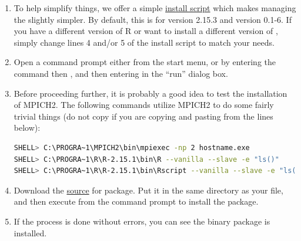 \begin{enumerate}
  \item To help simplify things, we offer a simple \href{https://github.com/wrathematics/installation-instructions/raw/master/windows/build_pbdMPI.bat}{install script} which makes managing the  slightly simpler.  By default, this is for  version 2.15.3 and  version 0.1-6.  If you have a different version of R or want to install a different version of , simply change lines 4 and/or 5 of the install script to match your needs.
  \item Open a command prompt either from the start menu, or by entering the command  then , and then entering  in the ``run'' dialog box.
  \item Before proceeding further, it is probably a good idea to test the installation of MPICH2.  The following commands utilize MPICH2 to do some fairly trivial things (do not copy  if you are copying and pasting from the lines below):
\begin{lstlisting}[language=sh]
SHELL> C:\PROGRA~1\MPICH2\bin\mpiexec -np 2 hostname.exe
SHELL> C:\PROGRA~1\R\R-2.15.1\bin\R --vanilla --slave -e "ls()"
SHELL> C:\PROGRA~1\R\R-2.15.1\bin\Rscript --vanilla --slave -e "ls()"
\end{lstlisting}
  \item Download the \href{http://cran.r-project.org/src/contrib/pbdMPI_0.1-6.tar.gz}{source} for \href{http://cran.r-project.org/web/packages/pbdMPI/index.html}{} package.  Put it in the same directory as your  file, and then execute  from the command prompt to install the package.
  \item If the process is done without errors, you can see the binary package is installed. 
\end{enumerate}




